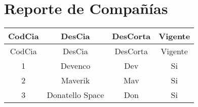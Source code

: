 \documentclass{article}
\begin{document}
\section{Reporte de Compañías}
\begin{longtable}{|c|c|c|c|}
\hline
CodCia & DesCia & DesCorta & Vigente \\
\hline
\endfirsthead
\hline
CodCia & DesCia & DesCorta & Vigente \\
\hline
\endhead
1 & Devenco & Dev & Si \\
2 & Maverik & Mav & Si \\
3 & Donatello Space & Don & Si \\
\hline
\end{longtable}
\end{document}
